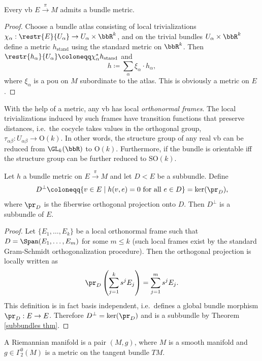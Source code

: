 \begin{thm}
Every \gls{vb} $E\overset\pi\to M$ admits a bundle metric. 
\end{thm}
\begin{proof}
Choose a bundle atlas consisting of local trivializations $\chi_\alpha:\restr{E}{U_\alpha}\to U_\alpha\times\bbR^k$, and on the trivial bundles $U_\alpha\times\bbR^k$ define a metric $h_{\text{stand}}$ using the standard metric on $\bbR^k$. Then $\restr{h_\alpha}{U_\alpha}\coloneqq \chi_\alpha^\ast h_{\text{stand}}$ and 
\[h\coloneqq \sum_\alpha \xi_\alpha \cdot h_\alpha,\]
where $\xi_\alpha$ is a \gls{pou} on $M$ subordinate to the atlas. This is obviously a metric on $E$.
\end{proof}
\begin{cor}
With the help of a metric, any \gls{vb} has local \emph{orthonormal frames}. The local trivializations induced by such frames have transition functions that preserve distances, i.e.\ the cocycle takes values in the orthogonal group, $\tau_{\alpha\beta}:U_{\alpha\beta}\to \mathrm{O}(k)$. In other words, the structure group of any real \gls{vb} can be reduced from $\GL_k(\bbR )$ to $\mathrm{O}(k)$. Furthermore, if the bundle is orientable iff the structure group can be further reduced to $\mathrm{SO}(k)$.
\end{cor}

\begin{prop}
Let $h$ a bundle metric on $E\overset\pi\to M$ and let $D< E$ be a subbundle. Define
\[D^\perp \coloneqq \{v\in E\mid h(v,e)=0 \text{ for all }e\in D\}=\ker (\pr_D),\]
where $\pr_D$ is the fiberwise orthogonal projection onto $D$. Then $D^\perp$ is a subbundle of $E$.
\end{prop}
\begin{proof}
Let $\{E_1,\ldots,E_k\}$ be a local orthonormal frame such that $D=\Span(E_1,\ldots,E_m)$ for some $m\leq k$ (such local frames exist by the standard Gram-Schmidt orthogonalization procedure). Then the orthogonal projection is locally written as
\[\pr_D \left(\sum_{j=1}^k s^j E_j\right)=\sum_{j=1}^m s^j E_j.\]
This definition is in fact basis independent, i.e.\ defines a global bundle morphism $\pr_D:E\to E$. Therefore $D^\perp =\ker (\pr_D)$ and is a subbundle by Theorem \ref{subbundles thm}.
\end{proof}


\begin{defn}
A Riemannian manifold is a pair $(M,g)$, where $M$ is a smooth manifold and $g\in\Gamma^0_2(M)$ is a metric on the tangent bundle $TM$.
\end{defn}


